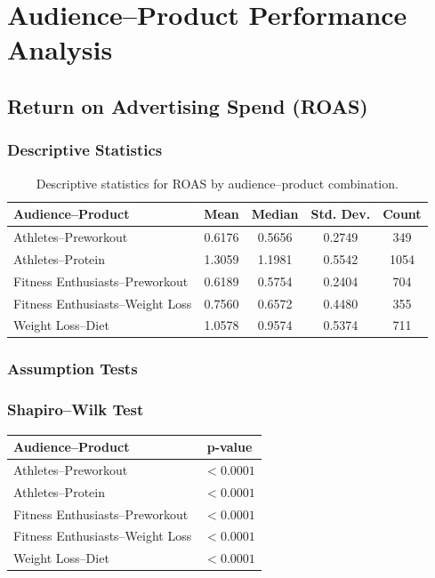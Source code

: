 \section{Audience--Product Performance Analysis}\label{appendix:audience_product_performance_analysis}

\subsection{Return on Advertising Spend (ROAS)}\label{appendix:audience_product_performance_analysis_ROAS}

\subsubsection{Descriptive Statistics}

\begin{table}[H]
	\centering
	\caption{Descriptive statistics for ROAS by audience--product combination.}
	\begin{tabular}{lcccc}
		\toprule
		Audience--Product & Mean & Median & Std. Dev. & Count \\
		\midrule
		Athletes--Preworkout & 0.6176 & 0.5656 & 0.2749 & 349 \\
		Athletes--Protein & 1.3059 & 1.1981 & 0.5542 & 1054 \\
		Fitness Enthusiasts--Preworkout & 0.6189 & 0.5754 & 0.2404 & 704 \\
		Fitness Enthusiasts--Weight Loss & 0.7560 & 0.6572 & 0.4480 & 355 \\
		Weight Loss--Diet & 1.0578 & 0.9574 & 0.5374 & 711 \\
		\bottomrule
	\end{tabular}
\end{table}

\subsubsection{Assumption Tests}

\subsubsection{Shapiro--Wilk Test}

\begin{table}[H]
	\centering
	\begin{tabular}{lc}
		\toprule
		Audience--Product & p-value \\
		\midrule
		Athletes--Preworkout & $<0.0001$ \\
		Athletes--Protein & $<0.0001$ \\
		Fitness Enthusiasts--Preworkout & $<0.0001$ \\
		Fitness Enthusiasts--Weight Loss & $<0.0001$ \\
		Weight Loss--Diet & $<0.0001$ \\
		\bottomrule
	\end{tabular}
\end{table}

